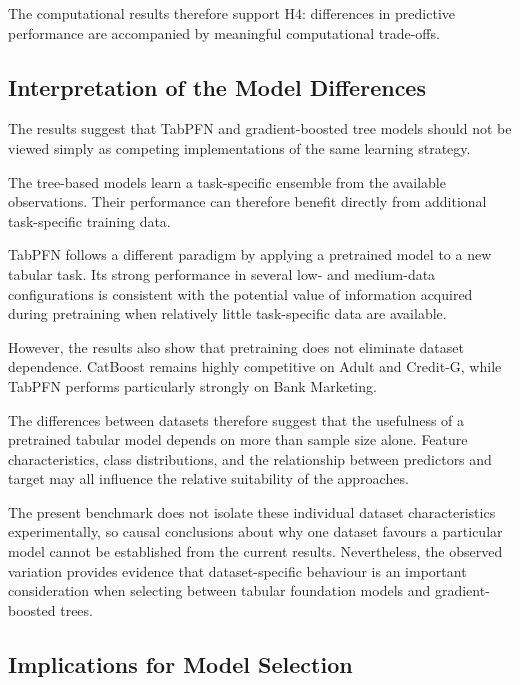 The computational results therefore support H4: differences in predictive performance are accompanied by meaningful computational trade-offs.



\subsection{Interpretation of the Model Differences}



The results suggest that TabPFN and gradient-boosted tree models should not be viewed simply as competing implementations of the same learning strategy.



The tree-based models learn a task-specific ensemble from the available observations. Their performance can therefore benefit directly from additional task-specific training data.



TabPFN follows a different paradigm by applying a pretrained model to a new tabular task. Its strong performance in several low- and medium-data configurations is consistent with the potential value of information acquired during pretraining when relatively little task-specific data are available.



However, the results also show that pretraining does not eliminate dataset dependence. CatBoost remains highly competitive on Adult and Credit-G, while TabPFN performs particularly strongly on Bank Marketing.



The differences between datasets therefore suggest that the usefulness of a pretrained tabular model depends on more than sample size alone. Feature characteristics, class distributions, and the relationship between predictors and target may all influence the relative suitability of the approaches.



The present benchmark does not isolate these individual dataset characteristics experimentally, so causal conclusions about why one dataset favours a particular model cannot be established from the current results. Nevertheless, the observed variation provides evidence that dataset-specific behaviour is an important consideration when selecting between tabular foundation models and gradient-boosted trees.



\subsection{Implications for Model Selection}



